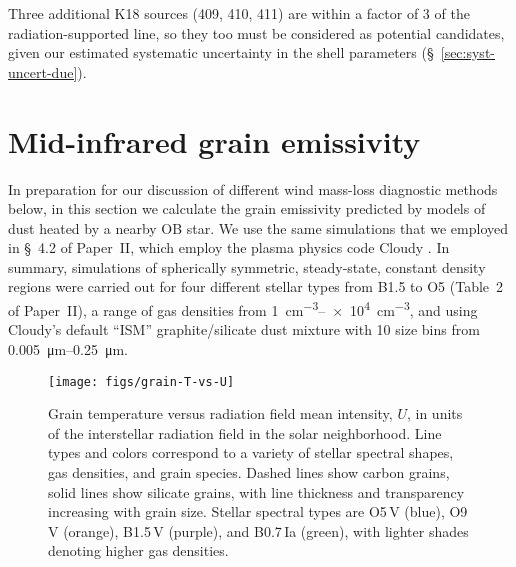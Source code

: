 \documentclass[useAMS, usenatbib, a4paper]{mnras}
\newcommand\hii{\ion{H}{ii}}
\begin{document}
Three additional K18 sources (409, 410, 411) are within a factor of 3
of the radiation-supported line, so they too must be considered as
potential candidates, given our estimated systematic uncertainty in
the shell parameters (\S~\ref{sec:syst-uncert-due}).


\section{Mid-infrared grain emissivity}
\label{sec:grain-temp-emiss}

In preparation for our discussion of different wind mass-loss
diagnostic methods below, in this section we calculate the grain
emissivity predicted by models of dust heated by a nearby OB star.  We
use the same simulations that we employed in \S~4.2 of Paper~II,
which employ the plasma physics code Cloudy \citep{Ferland:2013a,
  Ferland:2017a}.  In summary, simulations of spherically symmetric,
steady-state, constant density \hii{} regions were carried out for
four different stellar types from B1.5 to O5 (Table~2 of Paper~II), a
range of gas densities from \SIrange{1}{e4}{cm^{-3}}, and using
Cloudy's default ``ISM'' graphite/silicate dust mixture with 10 size
bins from \SIrange{0.005}{0.25}{\um}.  

\begin{figure}
  \centering
  \texttt{[image: figs/grain-T-vs-U]}
  \caption{Grain temperature versus radiation field mean intensity,
    \(U\), in units of the interstellar radiation field in the solar
    neighborhood.  Line types and colors correspond to a variety of
    stellar spectral shapes, gas densities, and grain species.  Dashed
    lines show carbon grains, solid lines show silicate grains, with
    line thickness and transparency increasing with grain size.
    Stellar spectral types are O5\,V (blue), O9\,V (orange), B1.5\,V
    (purple), and B0.7\,Ia (green), with lighter shades denoting
    higher gas densities. }
  \label{fig:grain-T-vs-U}
\end{figure}
\end{document}
